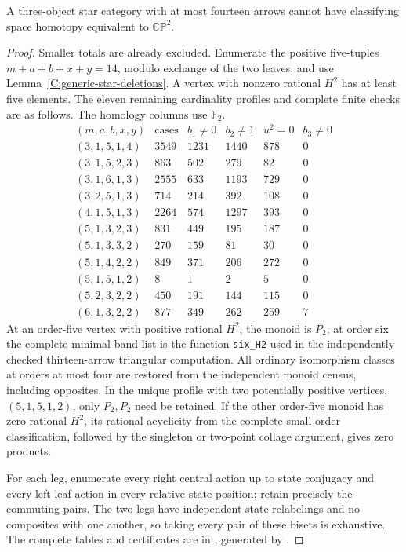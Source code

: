 \begin{theorem}\label{C:fourteen-all-stars}
A three-object star category with at most fourteen arrows cannot
have classifying space homotopy equivalent to $\mathbb{CP}^2$.
\end{theorem}
\begin{proof}
Smaller totals are already excluded. Enumerate the positive
five-tuples $m+a+b+x+y=14$, modulo exchange of the two leaves,
and use Lemma~\ref{C:generic-star-deletions}. A vertex with
nonzero rational $H^2$ has at least five elements. The eleven
remaining cardinality profiles and complete finite checks are
as follows. The homology columns use $\mathbb F_2$.
\[
\begin{array}{c|r|r|r|r|r}
(m,a,b,x,y)&\text{cases}&b_1\ne0&b_2\ne1&u^2=0&b_3\ne0\\\hline
(3,1,5,1,4)&3549&1231&1440&878&0\\
(3,1,5,2,3)&863&502&279&82&0\\
(3,1,6,1,3)&2555&633&1193&729&0\\
(3,2,5,1,3)&714&214&392&108&0\\
(4,1,5,1,3)&2264&574&1297&393&0\\
(5,1,3,2,3)&831&449&195&187&0\\
(5,1,3,3,2)&270&159&81&30&0\\
(5,1,4,2,2)&849&371&206&272&0\\
(5,1,5,1,2)&8&1&2&5&0\\
(5,2,3,2,2)&450&191&144&115&0\\
(6,1,3,2,2)&877&349&262&259&7
\end{array}
\]
At an order-five vertex with positive rational $H^2$, the monoid
is $P_2$; at order six the complete minimal-band list is the
function \texttt{six\_H2} used in the independently checked
thirteen-arrow triangular computation. All ordinary isomorphism
classes at orders at most four are restored from the independent
monoid census, including opposites. In the unique profile with
two potentially positive vertices, $(5,1,5,1,2)$, only $P_2,P_2$
need be retained. If the other order-five monoid has zero rational
$H^2$, its rational acyclicity from the complete small-order
classification, followed by the singleton or two-point collage
argument, gives zero products.

For each leg, enumerate every right central action up to state
conjugacy and every left leaf action in every relative state
position; retain precisely the commuting pairs. The two legs
have independent state relabelings and no composites with one
another, so taking every pair of these bisets is exhaustive.
The complete tables and certificates are in
, generated by
.


\end{proof}
